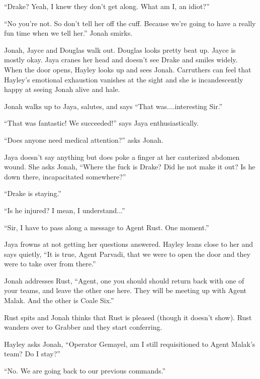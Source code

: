 ``Drake?  Yeah, I knew they don't get along.  What am I, an idiot?''

``No you're not.  So don't tell her off the cuff.  Because we're going to have a really fun time when we tell her.''  Jonah smirks.





Jonah, Jayce and Douglas walk out.  Douglas looks pretty beat up.  Jayce is mostly okay.  Jaya cranes her head and doesn't see Drake and smiles widely.  When the door opens, Hayley looks up and sees Jonah.  Carruthers can feel that Hayley's emotional exhaustion vanishes at the sight and she is incandescently happy at seeing Jonah alive and hale.



Jonah walks up to Jaya, salutes, and says ``That was....interesting Sir.''

``That was fantastic!  We succeeded!'' says Jaya enthusiastically.

``Does anyone need medical attention?'' asks Jonah.

Jaya doesn't say anything but does poke a finger at her cauterized abdomen wound.  She asks Jonah, ``Where the fuck is Drake?  Did he not make it out?  Is he down there, incapacitated somewhere?''

``Drake is staying.''

``Is he injured? I mean, I understand...''

``Sir, I have to pass along a message to Agent Rust.  One moment.''

Jaya frowns at not getting her questions answered.  Hayley leans close to her and says quietly, ``It is true, Agent Parvadi, that we were to open the door and they were to take over from there.''



Jonah addresses Rust, ``Agent, one you should should return back with one of your teams, and leave the other one here.  They will be meeting up with Agent Malak.  And the other is Coale Six.''

Rust spits and Jonah thinks that Rust is pleased (though it doesn't show).  Rust wanders over to Grabber and they start conferring.



Hayley asks Jonah, ``Operator Gemayel, am I still requisitioned to Agent Malak's team?  Do I stay?''

``No.  We are going back to our previous commands.''

